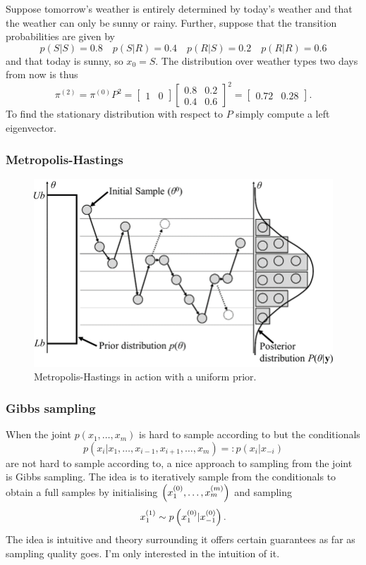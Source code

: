 \documentclass[11pt]{article}
\begin{document}
\begin{appendices}
\begin{example}
    Suppose tomorrow's weather is entirely determined by today's weather and that the weather can only be sunny or rainy. Further, suppose that the transition probabilities are given by
    $$
    p(S|S)=0.8\quad
    p(S|R)=0.4\quad
    p(R|S)=0.2\quad
    p(R|R)=0.6
    $$
    and that today is sunny, so $x_0=S$. The distribution over weather types two days from now is thus
    $$
    \pi^{(2)}
    =
    \pi^{(0)}P^2
    =
    \begin{bmatrix}1&0\end{bmatrix}
    \begin{bmatrix}
        0.8 & 0.2\\
        0.4 & 0.6
    \end{bmatrix}^2
    =
    \begin{bmatrix}0.72&0.28\end{bmatrix}.
    $$
    To find the stationary distribution with respect to $P$ simply compute a left eigenvector.
\end{example}

\subsubsection{Metropolis-Hastings}

\begin{figure}[t]
    \centering
    \includegraphics[width=\columnwidth]{./figures/appendix/metropolis-hastings.png}
    \caption{Metropolis-Hastings in action with a uniform prior.}
    \label{fig:metropolis_hastings}
\end{figure}

\subsubsection{Gibbs sampling}
When the joint $p(x_1,\dots,x_m)$ is hard to sample according to but the conditionals
$$
p(x_i|x_1,\dots,x_{i-1},x_{i+1},\dots,x_m)
=:
p(x_i|x_{-i})
$$
are not hard to sample according to, a nice approach to sampling from the joint is Gibbs sampling. The idea is to iteratively sample from the conditionals to obtain a full samples by initialising $\left(x_1^{(0)},\dots,x_m^{(m)}\right)$ and sampling
$$
x_1^{(1)}\sim p\left(x_1^{(0)}|x_{-1}^{(0)}\right).
$$
The idea is intuitive and theory surrounding it offers certain guarantees as far as sampling quality goes. I'm only interested in the intuition of it.


\end{appendices}
\end{document}
